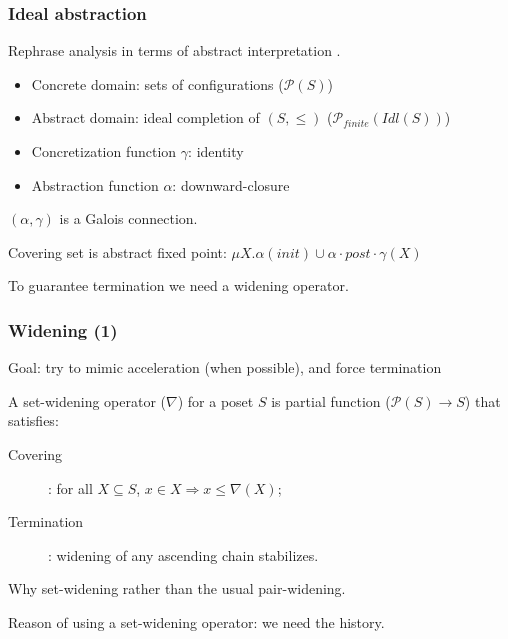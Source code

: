 \documentclass{beamer}
\begin{document}
\begin{frame}
  \frametitle{Ideal abstraction}

  Rephrase analysis in terms of abstract interpretation \cite{CousotCousot77AbstractInterpretation}.

  \begin{itemize}
  \item Concrete domain: sets of configurations ($\mathcal{P}(S)$)
  \item Abstract domain: \alert{ideal completion of $(S,\leq)$} ($\mathcal{P}_{finite}(Idl(S))$)
  \end{itemize}

  \vspace{5pt}

  \begin{itemize}
  \item Concretization function $\gamma$: identity
  \item Abstraction function $\alpha$: \alert{downward-closure}
  \end{itemize}
  $(\alpha,\gamma)$ is a Galois connection.

  \vspace{10pt}

  Covering set is abstract fixed point: $\mu X. \alpha(init) \cup \alpha \cdot post \cdot \gamma (X) $

  \vspace{5pt}

  To guarantee termination we need a widening operator.

\end{frame}

\begin{frame}
  \frametitle{Widening (1)}

  Goal: try to mimic acceleration (when possible), and force termination
  
  \vspace{1ex}

  A set-widening operator ($\nabla$) \cite{CousotCousot92AbstractInterpretationFrameworks} for a poset $S$ is partial function ($\mathcal{P}(S) \rightarrow S$) that satisfies:
  \begin{description}
  \item[Covering]: for all $X \subseteq S$, $x \in X \Rightarrow x \leq \nabla(X)$;
  \item[Termination]: widening of any ascending chain stabilizes.
  \end{description}

  \vspace{1ex}
  Why set-widening rather than the usual pair-widening.

  Reason of using a set-widening operator: we need the history.

\end{frame}
\end{document}
